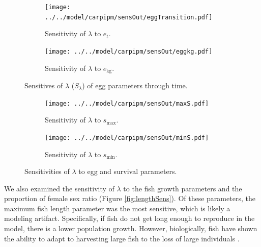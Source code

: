 \documentclass{article}[12pt]
\begin{document}
\begin{figure}[htbp]
	\centering
	\begin{subfigure}[b]{0.45\textwidth}
	   \texttt{[image: ../../model/carpipm/sensOut/eggTransition.pdf]} %
	   \caption{Sensitivity of \(\lambda\) to \(e_t\).}
	   \label{fig:sensET}
	\end{subfigure}
	\begin{subfigure}[b]{0.45\textwidth}
	   \texttt{[image: ../../model/carpipm/sensOut/eggkg.pdf]} %
	   \caption{Sensitivity of \(\lambda\) to \(e_\text{kg}\).}
	   \label{fig:sensEKG}
	\end{subfigure}
   \caption{Sensitives of \(\lambda\) (\(S_\lambda\)) of egg parameters through time.}
   	\begin{subfigure}[b]{0.45\textwidth}
	   \texttt{[image: ../../model/carpipm/sensOut/maxS.pdf]} %
	   \caption{Sensitivity of \(\lambda\) to \(s_\text{max}\).}
	   \label{fig:sensSmax}
	\end{subfigure}
	\begin{subfigure}[b]{0.45\textwidth}
	   \texttt{[image: ../../model/carpipm/sensOut/minS.pdf]} %
	   \caption{Sensitivity of \(\lambda\) to \(s_\text{min}\).}
	   \label{fig:sensSmin}
	\end{subfigure}  
   \caption{Sensitivities of \(\lambda\) to egg and survival parameters.}
   \label{fig:eggSens}  
\end{figure}

We also examined the sensitivity of \(\lambda\) to the fish growth parameters and the proportion of female sex ratio (Figure \ref{fig:lengthSens}). 
Of these parameters, the maximum fish length parameter was the most sensitive, which is likely a modeling artifact.
Specifically, if fish do not get long enough to reproduce in the model, there is a lower population growth.
However, biologically, fish have shown the ability to adapt to harvesting large fish to the loss of large individuals \citep[e.g., harvesting large fish;][]{birkeland2005importance}.
\end{document}
